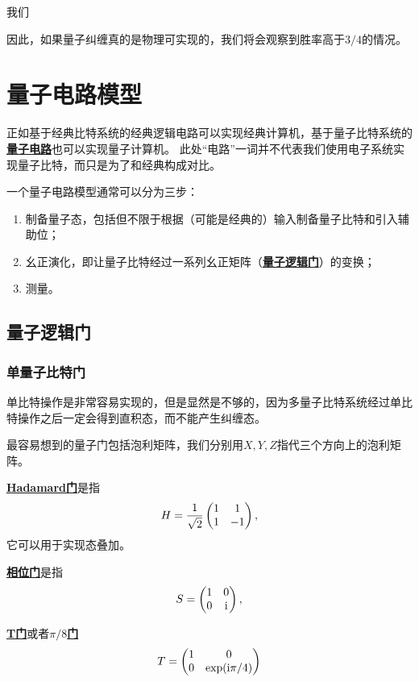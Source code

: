 \documentclass[hyperref, UTF8, a4paper]{ctexart}
\newcommand*{\ii}{\mathrm{i}}
\newcommand*{\concept}[1]{\underline{\textbf{#1}}}
\begin{document}
我们

因此，如果量子纠缠真的是物理可实现的，我们将会观察到胜率高于$3/4$的情况。

\section{量子电路模型}

正如基于经典比特系统的经典逻辑电路可以实现经典计算机，基于量子比特系统的\concept{量子电路}也可以实现量子计算机。
此处“电路”一词并不代表我们使用电子系统实现量子比特，而只是为了和经典构成对比。

一个量子电路模型通常可以分为三步：
\begin{enumerate}
    \item 制备量子态，包括但不限于根据（可能是经典的）输入制备量子比特和引入辅助位；
    \item 幺正演化，即让量子比特经过一系列幺正矩阵（\concept{量子逻辑门}）的变换；
    \item 测量。
\end{enumerate}

\subsection{量子逻辑门}

\subsubsection{单量子比特门}

单比特操作是非常容易实现的，但是显然是不够的，因为多量子比特系统经过单比特操作之后一定会得到直积态，而不能产生纠缠态。

最容易想到的量子门包括泡利矩阵，我们分别用$X, Y, Z$指代三个方向上的泡利矩阵。

\concept{Hadamard门}是指
\begin{equation}
    H = \frac{1}{\sqrt{2}} \pmqty{1 & 1 \\ 1 & -1},
\end{equation}
它可以用于实现态叠加。

\concept{相位门}是指
\begin{equation}
    S = \pmqty{1 & 0 \\ 0 & \ii},
\end{equation}

\concept{T门}或者\concept{$\pi/8$门}
\begin{equation}
    T = \pmqty{1 & 0 \\ 0 & \exp(\ii \pi / 4)}
\end{equation}
\end{document}
